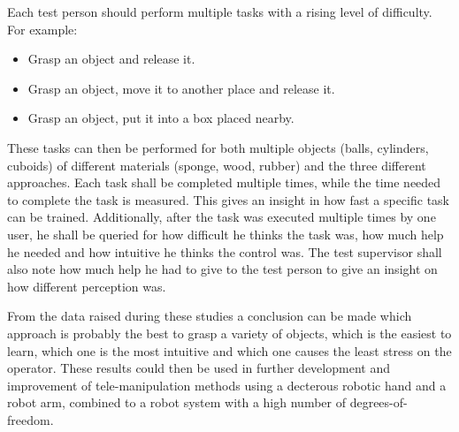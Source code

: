 Each test person should perform multiple tasks with a rising level of difficulty. For example:
\begin{itemize}
	\item Grasp an object and release it.
	\item Grasp an object, move it to another place and release it.
	\item Grasp an object, put it into a box placed nearby.
\end{itemize}
These tasks can then be performed for both multiple objects (balls, cylinders, cuboids) of different materials (sponge, wood, rubber) and the three different approaches. Each task shall be completed multiple times, while the time needed to complete the task is measured. This gives an insight in how fast a specific task can be trained. Additionally, after the task was executed multiple times by one user, he shall be queried for how difficult he thinks the task was, how much help he needed and how intuitive he thinks the control was. The test supervisor shall also note how much help he had to give to the test person to give an insight on how different perception was. 

From the data raised during these studies a conclusion can be made which approach is probably the best to grasp a variety of objects, which is the easiest to learn, which one is the most intuitive and which one causes the least stress on the operator. These results could then be used in further development and improvement of tele-manipulation methods using a decterous robotic hand and a robot arm, combined to a robot system with a high number of degrees-of-freedom.